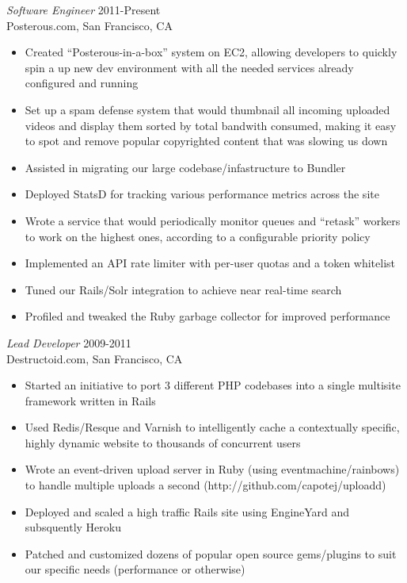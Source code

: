 \documentclass[margin]{res}
\begin{document}
\begin{resume}
  {\sl Software Engineer } \hfill 2011-Present \\
  Posterous.com, San Francisco, CA
  \begin{itemize}  \itemsep -2pt %
    \item Created ``Posterous-in-a-box'' system on EC2, allowing developers to quickly spin a up new dev environment with all the needed services already configured and running
    \item Set up a spam defense system that would thumbnail all incoming uploaded videos and display them sorted by total bandwith consumed, making it easy to spot and remove popular copyrighted content that was slowing us down
    \item Assisted in migrating our large codebase/infastructure to Bundler
    \item Deployed StatsD for tracking various performance metrics across the site
    \item Wrote a service that would periodically monitor queues and ``retask'' workers to work on the highest ones, according to a configurable priority policy
    \item Implemented an API rate limiter with per-user quotas and a token whitelist
    \item Tuned our Rails/Solr integration to achieve near real-time search
    \item Profiled and tweaked the Ruby garbage collector for improved performance


  \end{itemize}


  {\sl Lead Developer } \hfill 2009-2011 \\
  Destructoid.com, San Francisco, CA
  \begin{itemize}  \itemsep -2pt %
    \item Started an initiative to port 3 different PHP codebases into a single multisite framework written in Rails
    \item Used Redis/Resque and Varnish to intelligently cache a contextually specific, highly dynamic website to thousands of concurrent users
    \item Wrote an event-driven upload server in Ruby (using eventmachine/rainbows) to handle multiple uploads a second (http://github.com/capotej/uploadd)
    \item Deployed and scaled a high traffic Rails site using EngineYard and subsquently Heroku
    \item Patched and customized dozens of popular open source gems/plugins to suit our specific needs (performance or otherwise)
  \end{itemize}



\end{resume}
\end{document}
